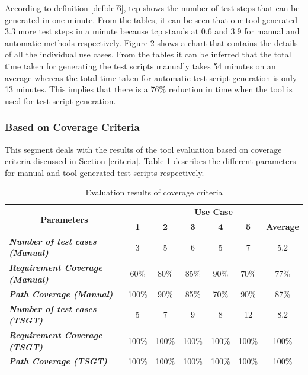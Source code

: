 According to definition \ref{def:def6}, \gls{tcp} shows the number of test steps that can be generated in one minute. From the tables, it can be seen that our tool generated 3.3 more test steps in a minute because \gls{tcp} stands at 0.6 and 3.9 for manual and automatic methods respectively. Figure 2 shows a chart that contains the details of all the individual use cases.
From the tables it can be inferred that the total time taken for generating the test scripts manually takes 54 minutes on an average whereas the total time taken for automatic test script generation is only 13 minutes. This implies that there is a 76\% reduction in time when the tool is used for test script generation.

\subsubsection{Based on Coverage Criteria}

This segment deals with the results of the tool evaluation based on coverage criteria discussed in Section \ref{criteria}. Table \ref{tab:coverageresults} describes the different parameters for manual and tool generated test scripts respectively.
\begin{table}[htbp]
  \centering
  \caption{Evaluation results of coverage criteria}
  	\begin{adjustbox}{width=1\textwidth}
    \begin{tabular}{|l|c|c|c|c|c|c|}
    \toprule
    \multicolumn{1}{|c|}{\multirow{2}[4]{*}{\textbf{Parameters}}} & \multicolumn{6}{c|}{\textbf{Use Case }} \\
\cmidrule{2-7}          & \textbf{1} & \textbf{2} & \textbf{3} & \textbf{4} & \textbf{5} & \textbf{Average} \\
    \midrule
    \textit{\textbf{Number of test cases (Manual)}} & 3     & 5     & 6     & 5     & 7     & 5.2 \\
    \midrule
    \textit{\textbf{Requirement Coverage  (Manual)}} & 60\%  & 80\%  & 85\%  & 90\%  & 70\%  & 77\% \\
    \midrule
    \textit{\textbf{Path Coverage  (Manual)}} & 100\% & 90\%  & 85\%  & 70\%  & 90\%  & 87\% \\
    \midrule
    \textit{\textbf{Number of test cases  (TSGT)}} & 5     & 7     & 9     & 8     & 12    & 8.2 \\
    \midrule
    \textit{\textbf{Requirement Coverage (TSGT)}} & 100\% & 100\% & 100\% & 100\% & 100\% & 100\% \\
    \midrule
    \textit{\textbf{Path Coverage (TSGT)}} & 100\% & 100\% & 100\% & 100\% & 100\% & 100\% \\
    \bottomrule
    \end{tabular}%
    \end{adjustbox}
  \label{tab:coverageresults}%
\end{table}%

